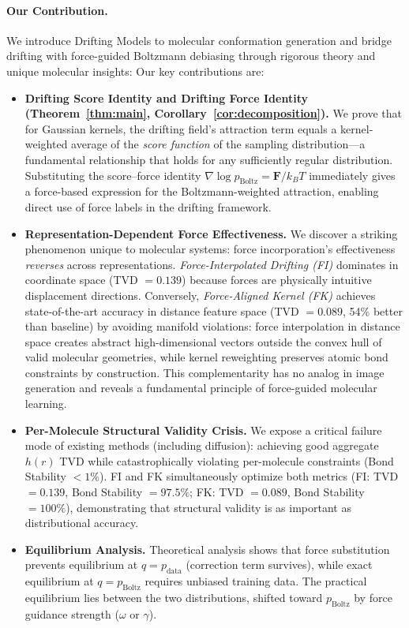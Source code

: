 \documentclass[11pt]{article}
\newcommand{\bF}{\mathbf{F}}
\newcommand{\pboltz}{p_{\text{Boltz}}}
\newcommand{\pdata}{p_{\text{data}}}
\newcommand{\kBT}{k_BT}
\begin{document}
\paragraph{Our Contribution.}
We introduce Drifting Models to molecular conformation generation and bridge drifting with force-guided Boltzmann debiasing through rigorous theory and unique molecular insights:
Our key contributions are:
\begin{itemize}
    \item \textbf{Drifting Score Identity and Drifting Force Identity (Theorem~\ref{thm:main}, Corollary~\ref{cor:decomposition}).} We prove that for Gaussian kernels, the drifting field's attraction term equals a kernel-weighted average of the \emph{score function} of the sampling distribution---a fundamental relationship that holds for any sufficiently regular distribution. Substituting the score--force identity $\nabla\log\pboltz = \bF/\kBT$ immediately gives a force-based expression for the Boltzmann-weighted attraction, enabling direct use of force labels in the drifting framework.
    \item \textbf{Representation-Dependent Force Effectiveness.} We discover a striking phenomenon unique to molecular systems: force incorporation's effectiveness \emph{reverses} across representations. \emph{Force-Interpolated Drifting (FI)} dominates in coordinate space (TVD $= 0.139$) because forces are physically intuitive displacement directions. Conversely, \emph{Force-Aligned Kernel (FK)} achieves state-of-the-art accuracy in distance feature space (TVD $= 0.089$, 54\% better than baseline) by avoiding manifold violations: force interpolation in distance space creates abstract high-dimensional vectors outside the convex hull of valid molecular geometries, while kernel reweighting preserves atomic bond constraints by construction. This complementarity has no analog in image generation and reveals a fundamental principle of force-guided molecular learning.
    \item \textbf{Per-Molecule Structural Validity Crisis.} We expose a critical failure mode of existing methods (including diffusion): achieving good aggregate $h(r)$ TVD while catastrophically violating per-molecule constraints (Bond Stability $< 1\%$). FI and FK simultaneously optimize both metrics (FI: TVD $= 0.139$, Bond Stability $= 97.5\%$; FK: TVD $= 0.089$, Bond Stability $= 100\%$), demonstrating that structural validity is as important as distributional accuracy.
    \item \textbf{Equilibrium Analysis.} Theoretical analysis shows that force substitution prevents equilibrium at $q = \pdata$ (correction term survives), while exact equilibrium at $q = \pboltz$ requires unbiased training data. The practical equilibrium lies between the two distributions, shifted toward $\pboltz$ by force guidance strength ($\omega$ or $\gamma$).
\end{itemize}
\end{document}
